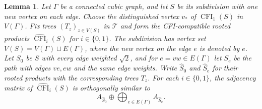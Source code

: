 \documentclass[11pt,a4paper]{article}
\theoremstyle{plain}
\newtheorem{lemma}[theorem]{Lemma}
\theoremstyle{definition}
\DeclareMathOperator{\CFI}{CFI}
\begin{document}
\begin{lemma}\label{lem:ss-cfi-blocks}
Let $\Gamma$ be a connected cubic graph, and let $S$ be its subdivision
with one new vertex on each edge.
Choose the distinguished vertex $v_*$ of $\CFI_1(S)$ in $V(\Gamma)$.
Fix trees $(T_z)_{z\in V(S)}$ in $\mathcal T$ and form the
CFI-compatible rooted products $\widehat{\CFI}_i(S)$ for $i\in\{0,1\}$.
The subdivision has vertex set $V(S)=V(\Gamma)\sqcup E(\Gamma)$,
where the new vertex on the edge $e$ is denoted by $e$.
Let $S_0$ be $S$ with every edge weighted $\sqrt2$, and for
$e=vw\in E(\Gamma)$ let $S_e$ be the path with edges $ve,ew$ and the
same edge weights.
Write $\widehat S_0$ and $\widehat S_e$ for their rooted products with
the corresponding trees $T_z$.
For each $i\in\{0,1\}$, the adjacency matrix of $\widehat{\CFI}_i(S)$
is orthogonally similar to
\begin{equation}\label{eq:ss-rooted-blocks}
 A_{\widehat S_0}\oplus\bigoplus_{e\in E(\Gamma)}A_{\widehat S_e}.
\end{equation}

\end{lemma}
\end{document}
